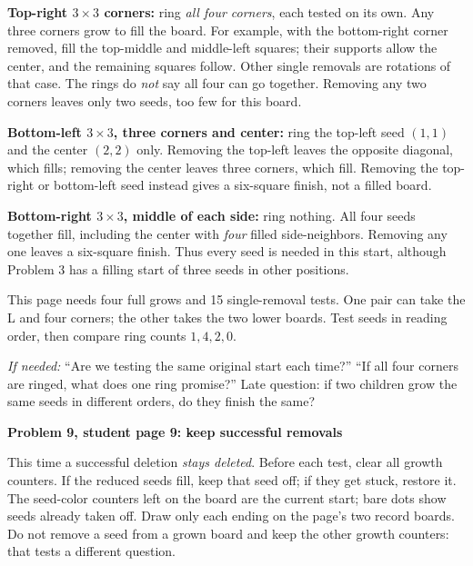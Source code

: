 \documentclass[11pt]{article}
\newcommand{\sub}[1]{\par\textbf{#1}\par}
\newcommand{\hint}[1]{\textit{If needed:} #1}
\begin{document}
\textbf{Top-right $3\times3$ corners:} ring \emph{all four corners}, each tested on its own. Any three corners grow to fill the board. For example, with the bottom-right corner removed, fill the top-middle and middle-left squares; their supports allow the center, and the remaining squares follow. Other single removals are rotations of that case. The rings do \emph{not} say all four can go together. Removing any two corners leaves only two seeds, too few for this board.

\textbf{Bottom-left $3\times3$, three corners and center:} ring the top-left seed $(1,1)$ and the center $(2,2)$ only. Removing the top-left leaves the opposite diagonal, which fills; removing the center leaves three corners, which fill. Removing the top-right or bottom-left seed instead gives a six-square finish, not a filled board.

\textbf{Bottom-right $3\times3$, middle of each side:} ring nothing. All four seeds together fill, including the center with \emph{four} filled side-neighbors. Removing any one leaves a six-square finish. Thus every seed is needed in this start, although Problem 3 has a filling start of three seeds in other positions.

This page needs four full grows and 15 single-removal tests. One pair can take the L and four corners; the other takes the two lower boards. Test seeds in reading order, then compare ring counts $1,4,2,0$.

\hint{``Are we testing the same original start each time?'' ``If all four corners are ringed, what does one ring promise?''} Late question: if two children grow the same seeds in different orders, do they finish the same?

\sub{Problem 9, student page 9: keep successful removals}
This time a successful deletion \emph{stays deleted}. Before each test, clear all growth counters. If the reduced seeds fill, keep that seed off; if they get stuck, restore it. The seed-color counters left on the board are the current start; bare dots show seeds already taken off. Draw only each ending on the page's two record boards. Do not remove a seed from a grown board and keep the other growth counters: that tests a different question.
\end{document}
